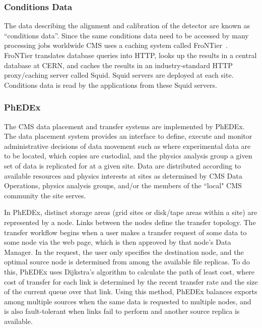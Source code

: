 \subsubsection{Conditions Data}
\label{sec:3_1_3}
The data describing the alignment and calibration of the detector are known as ``conditions data''. Since the same conditions data need to be accessed by many processing jobs worldwide CMS uses a caching system called FroNTier~\cite{RefFrontier}.
FroNTier translates database queries into HTTP, looks up the results in a central database at CERN, and caches the results in an industry-standard HTTP proxy/caching server called Squid. Squid servers are deployed at each site. Conditions data is read by the applications from these Squid servers.

\subsubsection{PhEDEx}
\label{sec:3_1_4}
The CMS data placement and transfer systems are implemented by
PhEDEx\cite{RefPhEDEx}. The data placement system provides an
interface to define, execute and monitor administrative decisions of
data movement such as where experimental data are to be located, which
copies are custodial, and %
the physics analysis group a given set of data is replicated for at a given site.
Data are distributed according to available resources
and physics interests at sites as determined by CMS Data Operations,
physics analysis groups, and/or the members of the ``local" CMS community the site serves. 

In PhEDEx, distinct storage areas (grid sites or disk/tape areas
within a site) are represented by a node.  Links between the nodes
define the transfer topology.  The transfer workflow begins when a
user makes a transfer request of some data to some node via the web
page, which is then approved by that node's Data Manager.  In the
request, the user only specifies the destination node, and the optimal
source node is determined from among the available file replicas.  To
do this, PhEDEx uses Dijkstra's algorithm to calculate the path of
least cost, where cost of transfer for each link is determined by the
recent transfer rate and the size of the current queue over that link.
Using this method, PhEDEx balances exports among multiple sources when
the same data is requested to multiple nodes, and is also
fault-tolerant when links fail to perform and another source replica
is available.

